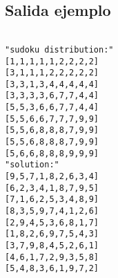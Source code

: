 \documentclass[12pt]{article}
\begin{document}
\subsection{Salida ejemplo}
\begin{lstlisting}

"sudoku distribution:"
[1,1,1,1,1,2,2,2,2]
[3,1,1,1,2,2,2,2,2]
[3,3,1,3,4,4,4,4,4]
[3,3,3,3,6,7,7,4,4]
[5,5,3,6,6,7,7,4,4]
[5,5,6,6,7,7,7,9,9]
[5,5,6,8,8,8,7,9,9]
[5,5,6,8,8,8,7,9,9]
[5,6,6,8,8,8,9,9,9]
"solution:"
[9,5,7,1,8,2,6,3,4]
[6,2,3,4,1,8,7,9,5]
[7,1,6,2,5,3,4,8,9]
[8,3,5,9,7,4,1,2,6]
[2,9,4,5,3,6,8,1,7]
[1,8,2,6,9,7,5,4,3]
[3,7,9,8,4,5,2,6,1]
[4,6,1,7,2,9,3,5,8]
[5,4,8,3,6,1,9,7,2]
\end{lstlisting}
\end{document}
